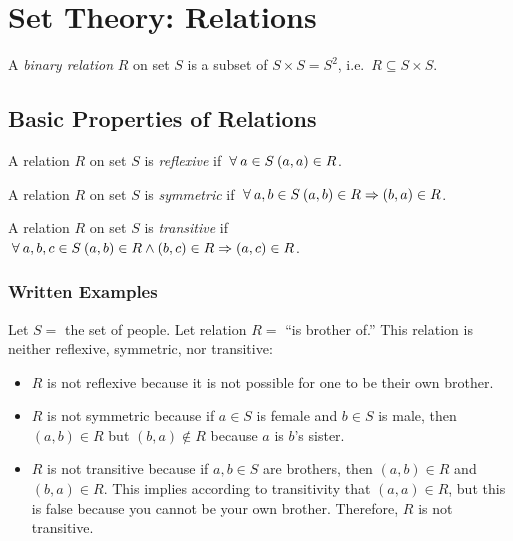 
\section{Set Theory: Relations}

\begin{definition}
    A \emph{binary relation} \(R\) on set \(S\) is a subset of \(S\times S=S^2\), i.e.\ \(R\subseteq S\times S\).
\end{definition}

\bigskip
\subsection{Basic Properties of Relations}

\begin{definition}
    A relation \(R\) on set \(S\) is \emph{reflexive} if \(\:\forall\: a\in S\:(a,a)\in R\).
\end{definition}

\bigskip
\begin{definition}
    A relation \(R\) on set \(S\) is \emph{symmetric} if \(\:\forall\: a,b\in S\:(a,b)\in R\Rightarrow(b,a)\in R\).
\end{definition}

\bigskip
\begin{definition}
    A relation \(R\) on set \(S\) is \emph{transitive} if \(\:\forall\: a,b,c\in S\:(a,b)\in R\land(b,c)\in R\Rightarrow(a,c)\in R\).
\end{definition}

\subsubsection{Written Examples}
Let \(S=\) the set of people. Let relation \(R=\) ``is brother of.'' This relation is neither reflexive, symmetric, nor transitive:
\begin{itemize}
    \item \(R\) is not reflexive because it is not possible for one to be their own brother.
    \item \(R\) is not symmetric because if \(a\in S\) is female and \(b\in S\) is male, then \((a,b)\in R\) but \((b,a)\not\in R\) because \(a\) is 
    \(b\)'s sister.
    \item \(R\) is not transitive because if \(a,b\in S\) are brothers, then \((a,b)\in R\) and \((b,a)\in R\). This implies according to transitivity that
    \((a,a)\in R\), but this is false because you cannot be your own brother. Therefore, \(R\) is not transitive. 
\end{itemize}

